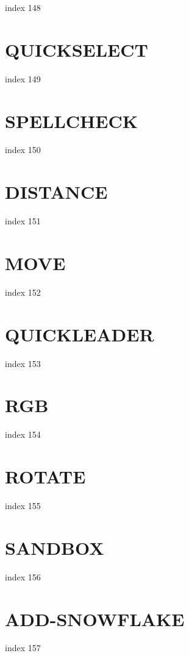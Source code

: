 \documentclass[10pt]{report}
\begin{document}
index 148

\section{QUICKSELECT}

index 149

\section{SPELLCHECK}

index 150

\section{DISTANCE}

index 151

\section{MOVE}

index 152

\section{QUICKLEADER}

index 153

\section{RGB}

 index 154

\section{ROTATE}

index 155

\section{SANDBOX}

index 156

\section{ADD-SNOWFLAKE}

index 157
\end{document}
